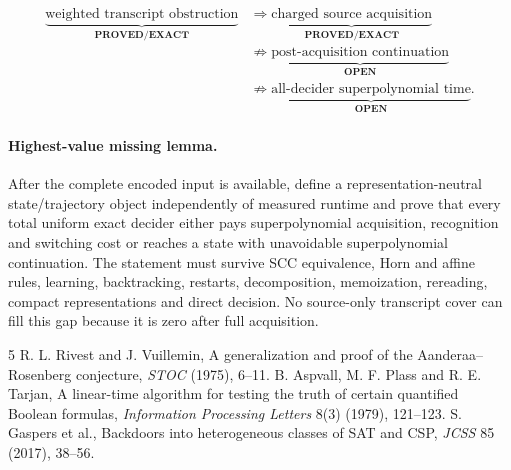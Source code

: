 \documentclass[11pt]{article}
\begin{document}
\begin{align*}
\underbrace{\text{weighted transcript obstruction}}_{\textbf{PROVED/EXACT}}
&\Longrightarrow
\underbrace{\text{charged source acquisition}}_{\textbf{PROVED/EXACT}}\\
&\not\Longrightarrow
\underbrace{\text{post-acquisition continuation}}_{\textbf{OPEN}}\\
&\not\Longrightarrow
\underbrace{\text{all-decider superpolynomial time}}_{\textbf{OPEN}}.
\end{align*}

\paragraph{Highest-value missing lemma.}
After the complete encoded input is available, define a representation-neutral
state/trajectory object independently of measured runtime and prove that every
total uniform exact decider either pays superpolynomial acquisition,
recognition and switching cost or reaches a state with unavoidable
superpolynomial continuation.  The statement must survive SCC equivalence,
Horn and affine rules, learning, backtracking, restarts, decomposition,
memoization, rereading, compact representations and direct decision.  No
source-only transcript cover can fill this gap because it is zero after full
acquisition.

\begin{thebibliography}{5}
 R. L. Rivest and J. Vuillemin, A generalization and proof of the
Aanderaa--Rosenberg conjecture, \emph{STOC} (1975), 6--11.
 B. Aspvall, M. F. Plass and R. E. Tarjan, A linear-time
algorithm for testing the truth of certain quantified Boolean formulas,
\emph{Information Processing Letters} 8(3) (1979), 121--123.
 S. Gaspers et al., Backdoors into heterogeneous classes of
SAT and CSP, \emph{JCSS} 85 (2017), 38--56.
\end{thebibliography}
\end{document}
